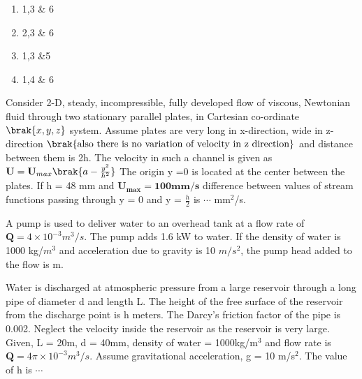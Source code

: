 \begin{enumerate}
    \item 1,3 \& 6
    \item 2,3 \& 6
    \item 1,3 \&5
    \item 1,4 \& 6
\end{enumerate}
\bigskip
\item Consider 2-D, steady, incompressible, fully developed flow of viscous, Newtonian fluid through two stationary parallel plates, in Cartesian co-ordinate $\brak{x,y,z}$ system. Assume plates are very long in x-direction, wide in z-direction $\brak{\text{also there is no variation of velocity in z direction}}$ and distance between them is 2h. The velocity in such a channel is given as $\mathbf{U}=\mathbf{U}_{max}\brak{a-\frac{y^2}{h^2}}$ The origin y =0 is located at the center between the plates. If h = 48 mm and $\mathbf{U_{max}=100mm/s}$ difference between values of stream functions passing through y = 0 and y = $\frac{h}{2}$ is $\cdots$ mm$^2$/s.
\bigskip
\item A pump is used to deliver water to an overhead tank at a flow rate of $\mathbf{Q}=4\times 10^{-3}m^3/s$. The pump adds 1.6 kW to water. If the density of water is 1000 kg/$m^3$ and acceleration due to gravity is 10 $m/s^2$, the pump head added to the flow is  m.
\bigskip
\item Water is discharged at atmospheric pressure from a large reservoir through a long pipe of diameter d and length L. The height of the free surface of the reservoir from the discharge point is h meters. The Darcy's friction factor of the pipe is 0.002. Neglect the velocity inside the reservoir as the reservoir is very large. Given, L = 20m, d = 40mm, density of water = 1000kg/m$^3$ and flow rate is $\mathbf{Q}=4\pi \times 10^{-3} m^3/s$. Assume gravitational acceleration, g = 10 m/s$^2$. The value of h is $\cdots$

